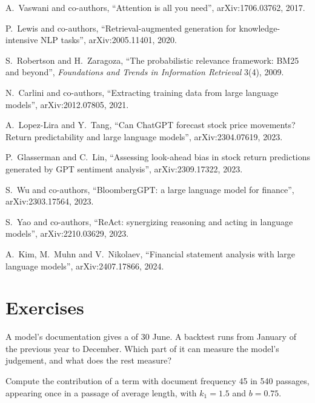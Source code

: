 \begin{omsources}
\item A.~Vaswani and co-authors, ``Attention is all you need'', arXiv:1706.03762, 2017.
\item P.~Lewis and co-authors, ``Retrieval-augmented generation for knowledge-intensive NLP tasks'', arXiv:2005.11401, 2020.
\item S.~Robertson and H.~Zaragoza, ``The probabilistic relevance framework: BM25 and beyond'', \emph{Foundations and Trends
in Information Retrieval} 3(4), 2009.
\item N.~Carlini and co-authors, ``Extracting training data from large language models'', arXiv:2012.07805, 2021.
\item A.~Lopez-Lira and Y.~Tang, ``Can ChatGPT forecast stock price movements? Return predictability and large language
models'', arXiv:2304.07619, 2023.
\item P.~Glasserman and C.~Lin, ``Assessing look-ahead bias in stock return predictions generated by GPT sentiment
analysis'', arXiv:2309.17322, 2023.
\item S.~Wu and co-authors, ``BloombergGPT: a large language model for finance'', arXiv:2303.17564, 2023.
\item S.~Yao and co-authors, ``ReAct: synergizing reasoning and acting in language models'', arXiv:2210.03629, 2023.
\item A.~Kim, M.~Muhn and V.~Nikolaev, ``Financial statement analysis with large language models'', arXiv:2407.17866, 2024.
\end{omsources}

\section{Exercises}

\begin{exercise}[$\star$]\label{exo:ml:large-language-models-in-finance:1}
A model's documentation gives a  of 30 June. A backtest runs from January of the previous year to December.
Which part of it can measure the model's judgement, and what does the rest measure?
\end{exercise}

\begin{exercise}[$\star$]\label{exo:ml:large-language-models-in-finance:2}
Compute the  contribution of a term with document frequency 45 in 540 passages, appearing once in a passage of average
length, with $k_1 = 1.5$ and $b = 0.75$.
\end{exercise}

